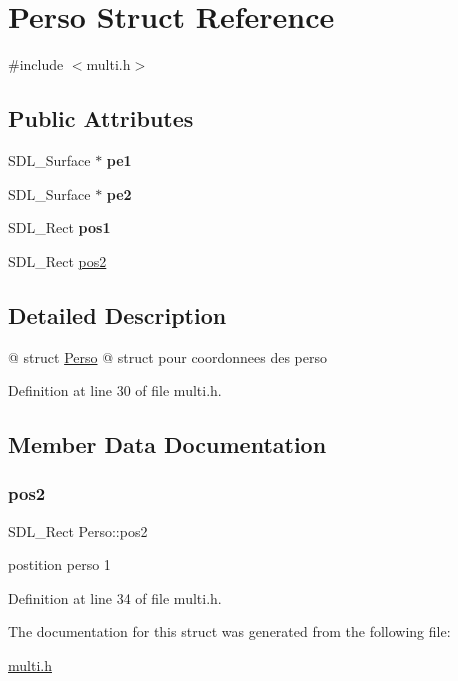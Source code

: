 \hypertarget{structPerso}{}\section{Perso Struct Reference}
\label{structPerso}


{\ttfamily \#include $<$multi.\+h$>$}

\subsection*{Public Attributes}
\begin{DoxyCompactItemize}
\item 
\mbox{\label{structPerso_a82376c3ad057a5536ca09183415b1be5}} 
S\+D\+L\+\_\+\+Surface $\ast$ {\bfseries pe1}
\item 
\mbox{\label{structPerso_a86b35c2d167d0699cfa8c07f3b868840}} 
S\+D\+L\+\_\+\+Surface $\ast$ {\bfseries pe2}
\item 
\mbox{\label{structPerso_afc2da2cff927c4acebf067998984e078}} 
S\+D\+L\+\_\+\+Rect {\bfseries pos1}
\item 
S\+D\+L\+\_\+\+Rect \hyperlink{structPerso_a64f931702a8b0004a6dfc38383d0343f}{pos2}
\end{DoxyCompactItemize}


\subsection{Detailed Description}
@ struct \hyperlink{structPerso}{Perso} @ struct pour coordonnees des perso 

Definition at line 30 of file multi.\+h.



\subsection{Member Data Documentation}
\mbox{\label{structPerso_a64f931702a8b0004a6dfc38383d0343f}} 
\subsubsection{\texorpdfstring{pos2}{pos2}}
{\footnotesize\ttfamily S\+D\+L\+\_\+\+Rect Perso\+::pos2}

postition perso 1 

Definition at line 34 of file multi.\+h.



The documentation for this struct was generated from the following file\+:\begin{DoxyCompactItemize}
\item 
\hyperlink{multi_8h}{multi.\+h}\end{DoxyCompactItemize}
